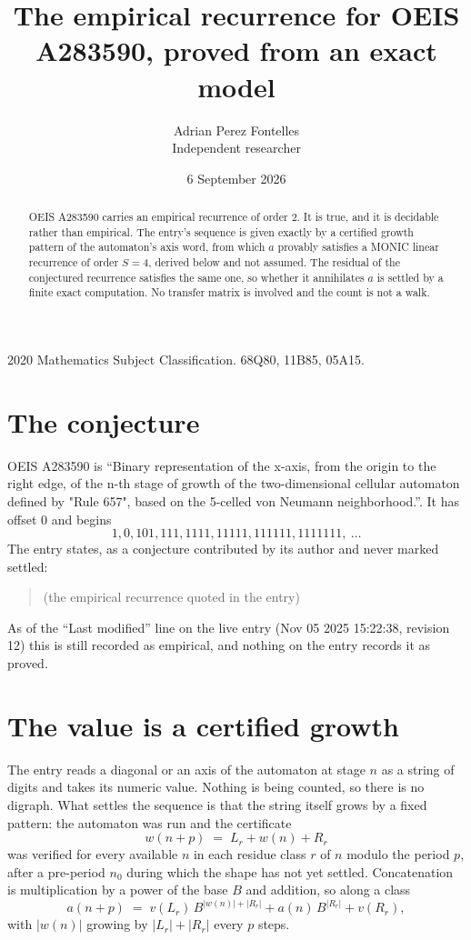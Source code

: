 \documentclass[11pt,a4paper]{article}
\title{The empirical recurrence for OEIS A283590, proved from an exact model}
\author{Adrian Perez Fontelles\\ \small Independent researcher}
\date{6 September 2026}
\theoremstyle{plain}
\theoremstyle{definition}
\begin{document}
\maketitle

\begin{abstract}
OEIS A283590 carries an empirical recurrence of order $2$. It is true, and it is
decidable rather than empirical. The entry's sequence is given exactly by a certified growth pattern of the automaton's axis word, from
which $a$ provably satisfies a MONIC linear recurrence of order $S=4$, derived below and not
assumed. The residual of the conjectured recurrence satisfies the same one, so whether it
annihilates $a$ is settled by a finite exact computation. No transfer matrix is involved and
the count is not a walk.
\end{abstract}

\noindent\small 2020 Mathematics Subject Classification. 68Q80, 11B85, 05A15.\normalsize

\section{The conjecture}

OEIS A283590 is ``Binary representation of the x-axis, from the origin to the right edge, of the n-th stage of growth of the two-dimensional cellular automaton defined by "Rule 657", based on the 5-celled von Neumann neighborhood.''. It has offset $0$ and begins
\[
1, 0, 101, 111, 1111, 11111, 111111, 1111111,\ \dots
\]
The entry states, as a conjecture contributed by its author and never marked settled:
\begin{quote}
(the empirical recurrence quoted in the entry)
\end{quote}
As of the ``Last modified'' line on the live entry (Nov 05 2025 15:22:38, revision 12)
this is still recorded as empirical, and nothing on the entry records it as proved.

\section{The value is a certified growth}

The entry reads a diagonal or an axis of the automaton at stage $n$ as a string of digits and takes its
numeric value. Nothing is being counted, so there is no digraph. What settles the sequence is
that the string itself grows by a fixed pattern: the automaton was run and the certificate
\[
w(n+p)\;=\;L_r + w(n) + R_r
\]
was verified for every available $n$ in each residue class $r$ of $n$ modulo the period $p$,
after a pre-period $n_0$ during which the shape has not yet settled. Concatenation is
multiplication by a power of the base $B$ and addition, so along a class
\[
a(n+p)\;=\;v(L_r)\,B^{|w(n)|+|R_r|} + a(n)\,B^{|R_r|} + v(R_r),
\]
with $|w(n)|$ growing by $|L_r|+|R_r|$ every $p$ steps.
\end{document}
